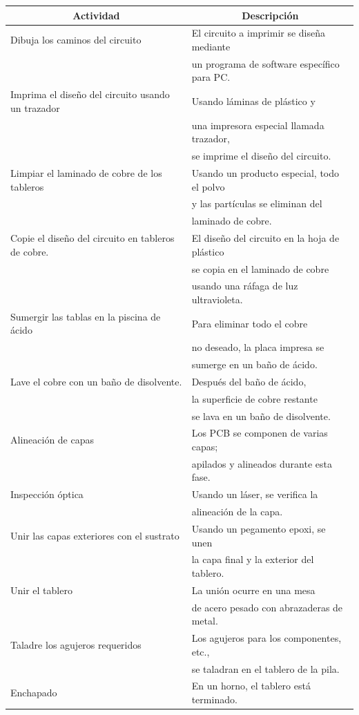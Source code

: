 \documentclass[10pt]{article}
\begin{document}
\begin{tabular}{|l|l|}
\hline
\multicolumn{1}{|c|}{Actividad} & \multicolumn{1}{|c|}{Descripción} \\
\hline
Dibuja los caminos del circuito & El circuito a imprimir se diseña mediante \\ &   un programa de software específico para PC. \\
\hline
Imprima el diseño del circuito usando un trazador & Usando láminas de plástico y \\ & una impresora especial llamada trazador, \\ &  se imprime el diseño del circuito. \\
\hline
Limpiar el laminado de cobre de los tableros & Usando un producto especial, todo el polvo \\ &  y las partículas se eliminan del \\ &  laminado de cobre. \\
\hline
Copie el diseño del circuito en tableros de cobre. & El diseño del circuito en la hoja de plástico \\ &  se copia en el laminado de cobre \\ &  usando una ráfaga de luz
ultravioleta. \\
\hline
Sumergir las tablas en la piscina de ácido & Para eliminar todo el cobre \\ &  no deseado, la placa impresa se \\ & sumerge en un baño de ácido. \\
\hline
Lave el cobre con un baño de disolvente. & Después del baño de ácido, \\ & la superficie de cobre restante \\ &  se lava en un baño de disolvente. \\
\hline
Alineación de capas & Los PCB se componen de varias capas; \\ & apilados y alineados durante esta fase. \\
\hline
Inspección óptica & Usando un láser, se verifica la \\ &  alineación de la capa. \\
\hline
Unir las capas exteriores con el sustrato & Usando un pegamento epoxi, se unen \\ & la capa final y la exterior del tablero. \\
\hline
Unir el tablero & La unión ocurre en una mesa \\ &  de acero pesado con abrazaderas de metal. \\
\hline
Taladre los agujeros requeridos & Los agujeros para los componentes, etc.,\\ &  se taladran en el tablero de la pila.  \\
\hline
Enchapado & En un horno, el tablero está terminado.\\
\hline
\end{tabular}\\
\newline
\end{document}
